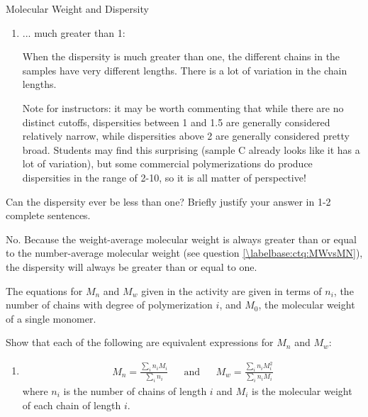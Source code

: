 \begin{activity}{Molecular Weight and Dispersity}
\begin{ctqs}
\begin{enumerate}
			\item ... much greater than 1:
			
				\begin{solution}[1in]{}
					When the dispersity is much greater than one, the different chains in the samples have very different lengths.  There is a lot of variation in the chain lengths.
					
					Note for instructors: it may be worth commenting that while there are no distinct cutoffs, dispersities between 1 and 1.5 are generally considered relatively narrow, while dispersities above 2 are generally considered pretty broad.  Students may find this surprising (sample C already looks like it has a lot of variation), but some commercial polymerizations do produce dispersities in the range of 2-10, so it is all matter of perspective!
				\end{solution}
			
		\end{enumerate}
		
	\question Can the dispersity ever be less than one?  Briefly justify your answer in 1-2 complete sentences.
	
		\begin{solution}[2in]{}
			No. Because the weight-average molecular weight is always greater than or equal to the number-average molecular weight (see question \ref{\labelbase:ctq:MWvsMN}), 
			the dispersity will always be greater than or equal to one.
		\end{solution}
	
\end{ctqs}



\begin{exercises}

		\exercise The equations for $M_n$ and $M_w$ given in the activity are given in terms of $n_i$, the number of chains with degree of polymerization $i$, and $M_0$, the molecular weight of a single monomer.
		
		Show that each of the following are equivalent expressions for $M_n$ and $M_w$:
		
			\begin{enumerate}
				
				\item \begin{align*}
					M_n = \frac{\sum_i n_i M_i}{\sum_i n_i} && \text{and} &&  M_w = \frac{\sum_i n_i M_i^2}{\sum_i n_i M_i}
				\end{align*}
					where $n_i$ is the number of chains of length $i$ and $M_i$ is the molecular weight of each chain of length $i$.
					

\end{enumerate}
\end{exercises}
\end{activity}
